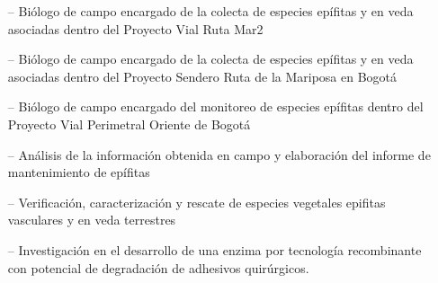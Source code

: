 \documentclass[10pt,legalpaper]{altacv}
\begin{document}
\begin{itemize}
    \setlength{\itemindent}{0.5em}
    \item[--]   \small{Biólogo de campo encargado de la colecta de especies epífitas y en veda asociadas dentro del Proyecto Vial Ruta Mar2}
\end{itemize}
\medskip

\begin{itemize}
    \setlength{\itemindent}{0.5em}
    \item[--]   \small{Biólogo de campo encargado de la colecta de especies epífitas y en veda asociadas dentro del Proyecto Sendero Ruta de la Mariposa en Bogotá}
\end{itemize}
\medskip

\begin{itemize}
    \setlength{\itemindent}{0.5em}
    \item[--]   \small{Biólogo de campo encargado del monitoreo de especies epífitas dentro del Proyecto Vial Perimetral Oriente de Bogotá}
    \item[--]   \small{Análisis de la información obtenida en campo y elaboración del informe de mantenimiento de epífitas}
\end{itemize}
\medskip

\begin{itemize}
    \setlength{\itemindent}{0.5em}
    \item[--]   \small{Verificación, caracterización y rescate de especies vegetales epifitas vasculares y en veda terrestres}
\end{itemize}
\medskip

\begin{itemize}
    \setlength{\itemindent}{0.5em}
    \item[--]   \small{Investigación en el desarrollo de una enzima por tecnología recombinante con potencial de degradación de adhesivos quirúrgicos.}
\end{itemize}
\medskip






\end{document}
